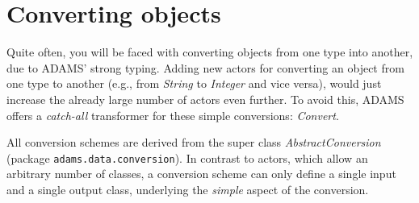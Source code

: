 \newpage
\section{Converting objects}
\label{converting_objects}
Quite often, you will be faced with converting objects from one type into
another, due to ADAMS' strong typing. Adding new actors for converting an object
from one type to another (e.g., from \textit{String} to \textit{Integer} and 
vice versa), would just increase the already large number of actors even
further. To avoid this, ADAMS offers a \textit{catch-all} transformer for these
simple conversions: \textit{Convert}. 

All conversion schemes are derived from the super class
\textit{AbstractConversion} (package \texttt{adams.data.conversion}).
In contrast to actors, which allow an arbitrary number of classes, a conversion scheme can only define
a single input and a single output class, underlying the \textit{simple} aspect
of the conversion.


